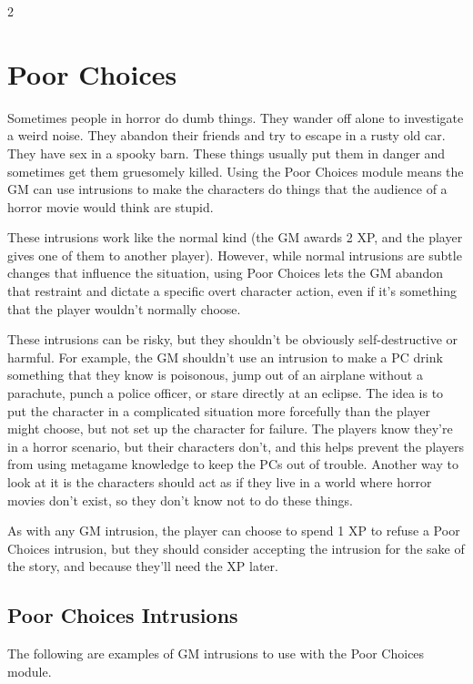 \begin{multicols}{2}
\section{Poor Choices}

Sometimes people in horror do dumb things. They wander off alone to investigate a weird noise. They abandon their friends and try to escape in a rusty old car. They have sex in a spooky barn. These things usually put them in danger and sometimes get them gruesomely killed. Using the Poor Choices module means the GM can use intrusions to make the characters do things that the audience of a horror movie would think are stupid.

These intrusions work like the normal kind (the GM awards 2 XP, and the player gives one of them to another player). However, while normal intrusions are subtle changes that influence the situation, using Poor Choices lets the GM abandon that restraint and dictate a specific overt character action, even if it’s something that the player wouldn’t normally choose.

These intrusions can be risky, but they shouldn’t be obviously self-destructive or harmful. For example, the GM shouldn’t use an intrusion to make a PC drink something that they know is poisonous, jump out of an airplane without a parachute, punch a police officer, or stare directly at an eclipse. The idea is to put the character in a complicated situation more forcefully than the player might choose, but not set up the character for failure. The players know they’re in a horror scenario, but their characters don’t, and this helps prevent the players from using metagame knowledge to keep the PCs out of trouble. Another way to look at it is the characters should act as if they live in a world where horror movies don’t exist, so they don’t know not to do these things.

As with any GM intrusion, the player can choose to spend 1 XP to refuse a Poor Choices intrusion, but they should consider accepting the intrusion for the sake of the story, and because they’ll need the XP later.

\subsection{Poor Choices Intrusions}
The following are examples of GM intrusions to use with the Poor Choices module.


\end{multicols}
